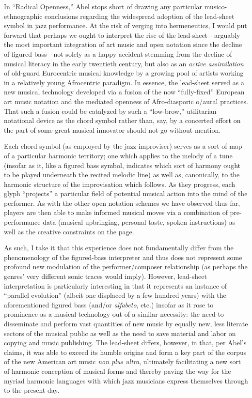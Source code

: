     In ``Radical Openness,'' Abel stops short of drawing any particular musico-ethnographic conclusions regarding the widespread adoption of the lead-sheet symbol in jazz performance. At the risk of verging into hermeneutics, I would put forward that perhaps we ought to interpret the rise of the lead-sheet---arguably the most important integration of art music and open notation since the decline of figured bass---not solely as a happy accident stemming from the decline of musical literacy in the early twentieth century, but also as an \textit{active assimilation} of old-guard Eurocentric musical knowledge by a growing pool of artists working in a relatively young Afrocentric paradigm. In essence, the lead-sheet served as a new musical technology developed via a fusion of the now ``fully-fixed'' European art music notation and the mediated openness of Afro-diasporic o/aural practices. That such a fusion could be catalyzed by such a ``low-brow,'' utilitarian notational device as the chord symbol rather than, say, by a concerted effort on the part of some great musical innovator should not go without mention.

    Each chord symbol (as employed by the jazz improviser) serves as a sort of map of a particular harmonic territory; one which applies to the melody of a tune (insofar as it, like a figured bass symbol, indicates which sort of harmony ought to be played underneath the recited melodic line) as well as, canonically, to the harmonic structure of the improvisation which follows. As they progress, each glyph ``projects'' a particular field of potential musical action into the mind of the performer. As with the other open notation schemes we have observed thus far, players are then able to make informed musical moves via a combination of pre-performance data (musical upbringing, personal taste, spoken instructions) as well as the creative constraints on the page. 

    As such, I take it that this experience does not fundamentally differ from the phenomenology of the figured-bass interpreter and thus does not represent some profound new modulation of the performer/composer relationship (as perhaps the genres' very different sonic traces would imply). However, lead-sheet interpretation is particularly interesting in that it represents an instance of ``parallel evolution'' (albeit one displaced by a few hundred years) with the aforementioned figured bass (and/or \textit{alfabeto}, etc.) insofar as it rose to prominence as a musical technology out of a similar necessity: the need to disseminate and perform vast quantities of new music by equally new, less literate sectors of the musical public as well as the need to save material and labor on copying and music publishing. The lead-sheet differs, however, in that, per Abel's claims, it was able to exceed its humble origins and form a key part of the corpus of the new American art music \textit{non plus ultra}, ultimately facilitating a new sort of harmonic conception of musical forms and thereby paving the way for the myriad harmonic languages with which jazz musicians express themselves through to the present day.


